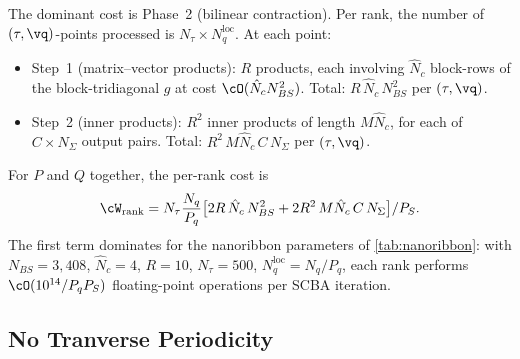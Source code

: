 The dominant cost is Phase~2 (bilinear contraction).  Per
rank, the number of $(\tau,\vq)$-points processed is
$N_\tau \times N_q^{\mathrm{loc}}$.  At each point:

\begin{itemize}
\item Step~1 (matrix--vector products): $R$ products, each
  involving $\hat{N}_c$ block-rows of the block-tridiagonal $g$
  at cost $\cO(\hat{N}_c N_{BS}^2)$.
  Total: $R\,\hat{N}_c\,N_{BS}^2$ per $(\tau,\vq)$.
\item Step~2 (inner products): $R^2$ inner products of length
  $M\hat{N}_c$, for each of $C \times N_\Sigma$ output pairs.
  Total: $R^2\,M\hat{N}_c\,C\,N_\Sigma$ per $(\tau,\vq)$.
\end{itemize}

For $P$ and $Q$ together, the per-rank cost is
\begin{equation}
  \cW_{\mathrm{rank}} =
  N_\tau \frac{N_q}{P_q}
  \bigl[
    2R\,\hat{N}_c\,N_{BS}^2
  + 2R^2\,M\hat{N}_c\,C\,N_\Sigma
  \bigr]
  / P_S.
  \label{eq:cost_per_rank}
\end{equation}
The first term dominates for the nanoribbon parameters of
\cref{tab:nanoribbon}: with $N_{BS} = 3{,}408$,
$\hat{N}_c = 4$, $R = 10$, $N_\tau = 500$,
$N_q^{\mathrm{loc}} = N_q/P_q$, each rank performs
$\cO(10^{14}/P_q P_S)$ floating-point operations per SCBA
iteration.


\subsection{No Tranverse Periodicity}
\label{sub:nq1}

